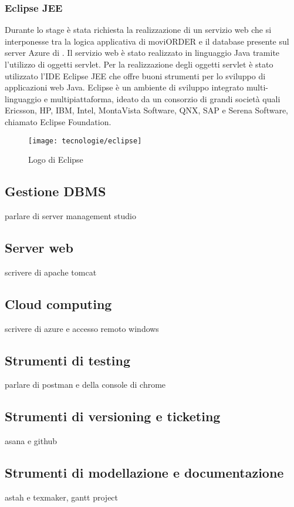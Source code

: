 \subsubsection{Eclipse JEE}

Durante lo stage è stata richiesta la realizzazione di un servizio web che si interponesse tra la logica applicativa di moviORDER e il database presente sul server Azure di \visione{}. Il servizio web è stato realizzato in linguaggio Java tramite l'utilizzo di oggetti servlet. Per la realizzazione degli oggetti servlet è stato utilizzato l'IDE Eclipse JEE che offre buoni strumenti per lo sviluppo di applicazioni web Java. Eclipse è un ambiente di sviluppo integrato multi-linguaggio e multipiattaforma, ideato da un consorzio di grandi società quali Ericsson, HP, IBM, Intel, MontaVista Software, QNX, SAP e Serena Software, chiamato Eclipse Foundation.

\begin{figure}[!h] 
    \centering 
    \texttt{[image: tecnologie/eclipse]} 
    \caption{Logo di Eclipse}
\end{figure}

\subsection{Gestione DBMS}
parlare di server management studio

\subsection{Server web}
scrivere di apache tomcat

\subsection{Cloud computing}
scrivere di azure e accesso remoto windows

\subsection{Strumenti di testing}
parlare di postman e della console di chrome

\subsection{Strumenti di versioning e ticketing}
asana e github

\subsection{Strumenti di modellazione e documentazione}
astah e texmaker, gantt project


